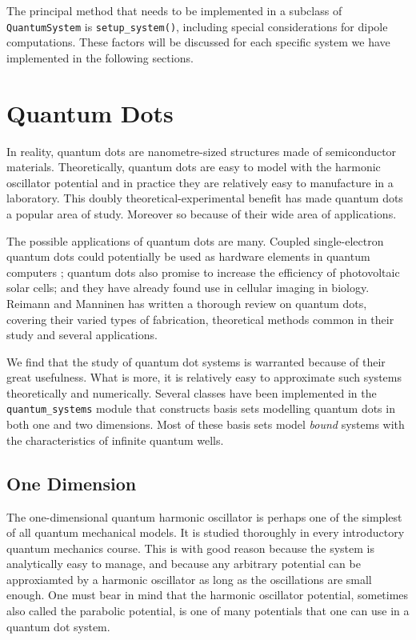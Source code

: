 The principal method that needs to be implemented in a subclass of
\lstinline{QuantumSystem} is
\lstinline{setup_system()}, including special considerations for dipole computations.
These factors will be discussed for each specific system we have implemented in the 
following sections.

\section{Quantum Dots}

In reality, quantum dots are nanometre-sized structures made of semiconductor materials.
Theoretically, quantum dots are easy to model with the harmonic oscillator potential and 
in practice
they are relatively easy to manufacture in a laboratory. This doubly
theoretical-experimental benefit has made quantum dots a popular area of study. Moreover so 
because of their wide area of applications.

The possible applications of quantum dots are many. Coupled single-electron quantum dots 
could potentially be used as hardware elements in quantum computers \cite{loss1998quantum}; quantum dots also promise to increase the efficiency of 
photovoltaic solar cells; and they have already found use in cellular imaging in biology.
Reimann and Manninen \cite{reimann2002electronic} has written a
thorough review on quantum dots, covering their varied types of fabrication, theoretical
methods common in their study and several applications.

We find that the study of quantum dot systems is warranted because of their great usefulness.
What is more, it is relatively easy to approximate such systems theoretically and 
numerically. 
Several classes have been implemented in the \lstinline{quantum_systems} module
that constructs basis sets modelling 
quantum dots in both one and two dimensions. Most of these basis sets model \emph{bound} systems
with the characteristics of infinite quantum wells. 

\subsection{One Dimension}

The one-dimensional quantum harmonic oscillator is perhaps one of the simplest of
all quantum mechanical models. It is studied thoroughly in every introductory quantum 
mechanics course. This is with good reason because the system is analytically easy to
manage, and because 
any arbitrary potential can be approxiamted by a harmonic oscillator as long 
as the oscillations are small enough.
One must bear in 
mind that the harmonic oscillator potential, sometimes also called the parabolic potential, 
is one of many potentials that one can use in a quantum dot system.


